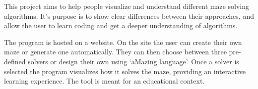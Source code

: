 This project aims to help people visualize and understand different maze solving algorithms. It’s purpose is to show clear differences between their approaches, and allow the user to learn coding and get a deeper understanding of algorithms. 

The program is hosted on a website. On the site the user can create their own maze or generate one automatically. They can then choose between three pre-defined solvers or design their own using ‘aMazing language’. Once a solver is selected the program visualizes how it solves the maze, providing an interactive learning experience. The tool is meant for an educational context. 